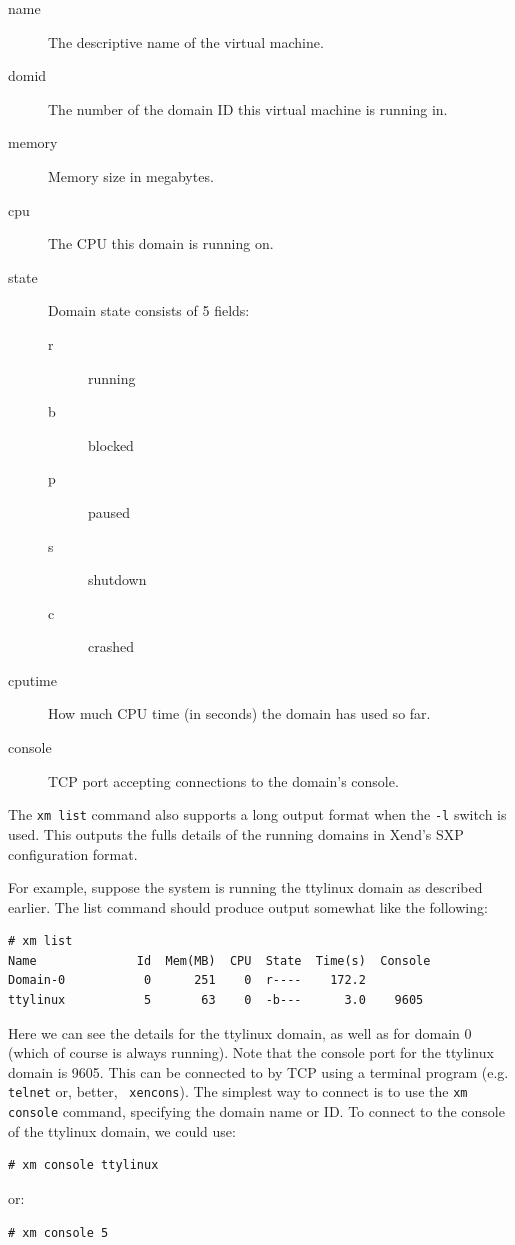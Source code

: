 \documentclass[11pt,twoside,final,openright]{xenstyle}
\begin{document}
\begin{description}
\item[name]  The descriptive name of the virtual machine.
\item[domid] The number of the domain ID this virtual machine is running in.
\item[memory] Memory size in megabytes.
\item[cpu]   The CPU this domain is running on.
\item[state] Domain state consists of 5 fields:
  \begin{description}
  \item[r] running
  \item[b] blocked
  \item[p] paused
  \item[s] shutdown
  \item[c] crashed
  \end{description}
\item[cputime] How much CPU time (in seconds) the domain has used so far.
\item[console] TCP port accepting connections to the domain's console.
\end{description}

The {\tt xm list} command also supports a long output format when the
{\tt -l} switch is used.  This outputs the fulls details of the
running domains in Xend's SXP configuration format.

For example, suppose the system is running the ttylinux domain as
described earlier.  The list command should produce output somewhat
like the following:
\begin{verbatim}
# xm list
Name              Id  Mem(MB)  CPU  State  Time(s)  Console
Domain-0           0      251    0  r----    172.2        
ttylinux           5       63    0  -b---      3.0    9605
\end{verbatim}

Here we can see the details for the ttylinux domain, as well as for
domain 0 (which of course is always running).  Note that the console
port for the ttylinux domain is 9605.  This can be connected to by TCP
using a terminal program (e.g. {\tt telnet} or, better, {\tt
xencons}).  The simplest way to connect is to use the {\tt xm console}
command, specifying the domain name or ID.  To connect to the console
of the ttylinux domain, we could use:
\begin{verbatim}
# xm console ttylinux
\end{verbatim}
or:
\begin{verbatim}
# xm console 5
\end{verbatim}
\end{document}
